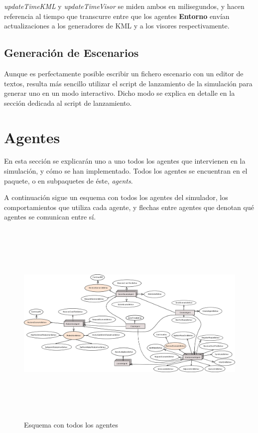 {\em updateTimeKML} y {\em updateTimeVisor} se miden ambos en milisegundos, y
hacen referencia al tiempo que transcurre entre que los agentes {\bf Entorno}
envían actualizaciones a los generadores de KML y a los visores respectivamente.

\subsection*{Generación de Escenarios}

Aunque es perfectamente posible escribir un fichero escenario con un editor de
textos, resulta más sencillo utilizar el script de lanzamiento de la simulación
para generar uno en un modo interactivo. Dicho modo se explica en detalle en la
sección dedicada al script de lanzamiento.

\section*{Agentes}

En esta sección se explicarán uno a uno todos los agentes que intervienen en la
simulación, y cómo se han implementado. Todos los agentes se encuentran en el
paquete, o en subpaquetes de éste, {\em agents}.

A continuación sigue un esquema con todos los agentes del simulador, los
comportamientos que utiliza cada agente, y flechas entre agentes que denotan
qué agentes se comunican entre sí.

\begin{figure}[H]
 \centering
 \includegraphics[height=100mm,angle=90]{figuras/cap5/agents.png}
 \caption{Esquema con todos los agentes}
\end{figure}

